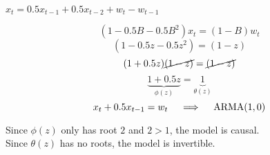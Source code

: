 $x_t = 0.5x_{t-1} + 0.5x_{t-2} + w_t - w_{t-1}$

$$(1-0.5B-0.5B^2)x_t = (1-B)w_t$$
$$(1-0.5z-0.5z^2) = (1-z)$$
$$(1+0.5z)\cancel{(1-z)} = \cancel{(1-z)}$$
$$\underbrace{1+0.5z}_{\phi(z)}= \underbrace{1}_{\theta(z)}$$
$$x_t + 0.5x_{t-1} = w_t \quad \implies \quad \operatorname{ARMA}(1,0)$$

\noindent Since $\phi(z)$ only has root $2$ and $2 > 1$, the model is causal.
\\Since $\theta(z)$ has no roots, the model is invertible.